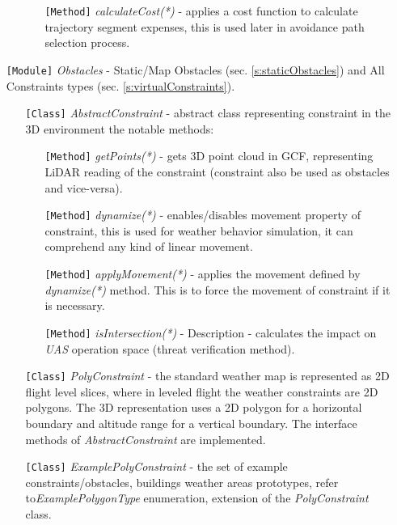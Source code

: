 \begin{itemize}
\begin{itemize}
\begin{itemize}
                \item[\texttt{[Method]}] \emph{calculateCost(*)} - applies a cost function to calculate trajectory segment expenses, this is used later in avoidance path selection process.
        \end{itemize}
    \end{itemize}
    
    
    \item[\texttt{[Module]}] \emph{Obstacles} - Static/Map Obstacles (sec. \ref{s:staticObstacles}) and All Constraints types (sec. \ref{s:virtualConstraints}).
    \begin{itemize}
        \item[\texttt{[Class]}] \emph{AbstractConstraint} - abstract class representing constraint in the 3D environment the notable methods:
        \begin{itemize}
            \item[\texttt{[Method]}] \emph{getPoints(*)} - gets 3D point cloud in GCF, representing LiDAR reading of the constraint (constraint also be used as obstacles and vice-versa).
            
            \item[\texttt{[Method]}] \emph{dynamize(*)} - enables/disables movement property of constraint, this is used for weather behavior simulation, it can comprehend any kind of linear movement.
            
            \item[\texttt{[Method]}] \emph{applyMovement(*)} - applies the movement defined by \emph{dynamize(*)} method. This is to force the movement of constraint if it is necessary.
            
            \item[\texttt{[Method]}] \emph{isIntersection(*)} - Description - calculates the impact on \emph{UAS} operation space (threat verification method).
        \end{itemize}
        
        \item[\texttt{[Class]}] \emph{PolyConstraint} - the standard weather map is represented as 2D flight level slices, where in leveled flight the weather constraints are 2D polygons. The 3D representation uses a 2D polygon for a horizontal boundary and altitude range for a vertical boundary. The interface methods of \emph{AbstractConstraint} are implemented.
        
        \item[\texttt{[Class]}] \emph{ExamplePolyConstraint} - the set of example constraints/obstacles, buildings weather areas prototypes, refer to\emph{ExamplePolygonType} enumeration, extension of the \emph{PolyConstraint} class.
        

\end{itemize}
\end{itemize}
